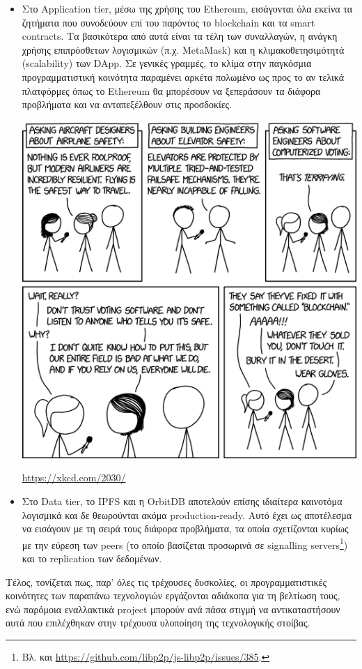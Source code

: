 \begin{itemize}
	\item Στο Application tier, μέσω της χρήσης του Ethereum, εισάγονται όλα εκείνα τα ζητήματα που συνοδεύουν επί του παρόντος το blockchain και τα smart contracts. Τα βασικότερα από αυτά είναι τα τέλη των συναλλαγών, η ανάγκη χρήσης επιπρόσθετων λογισμικών (π.χ. MetaMask) και η κλιμακοθετησιμότητά (scalability) των DApp. Σε γενικές γραμμές, το κλίμα στην παγκόσμια προγραμματιστική κοινότητα παραμένει αρκέτα πολωμένο ως προς το αν τελικά πλατφόρμες όπως το Ethereum θα μπορέσουν να ξεπεράσουν τα διάφορα προβλήματα και να ανταπεξέλθουν στις προσδοκίες.

	\begin{enumitemcenteredfigure}
		\includegraphics[width=.50\textwidth]{assets/figures/chapter-5/5.1.xkcd_2030_voting_software}
		\caption{\url{https://xkcd.com/2030/}}
	\end{enumitemcenteredfigure}

	\item Στο Data tier, το IPFS και η OrbitDB αποτελούν επίσης ιδιαίτερα καινοτόμα λογισμικά και δε θεωρούνται ακόμα production-ready. Αυτό έχει ως αποτέλεσμα να εισάγουν με τη σειρά τους διάφορα προβλήματα, τα οποία σχετίζονται κυρίως με την εύρεση των peers (το οποίο βασίζεται προσωρινά σε signalling servers\footnote{Βλ. και \url{https://github.com/libp2p/js-libp2p/issues/385}.}) και το replication των δεδομένων.
\end{itemize}

Τέλος, τονίζεται πως, παρ' όλες τις τρέχουσες δυσκολίες, οι προγραμματιστικές κοινότητες των παραπάνω τεχνολογιών εργάζονται αδιάκοπα για τη βελτίωση τους, ενώ παρόμοια εναλλακτικά project μπορούν ανά πάσα στιγμή να αντικαταστήσουν αυτά που επιλέχθηκαν στην τρέχουσα υλοποίηση της τεχνολογικής στοίβας.
